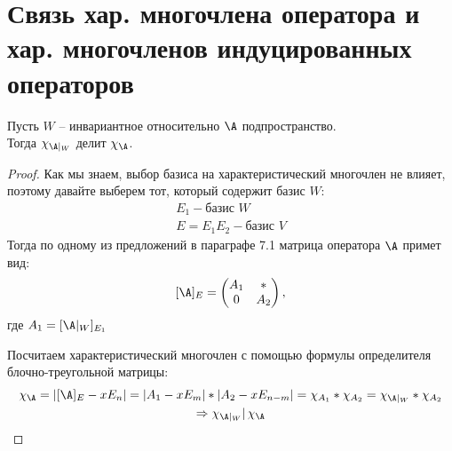\section{Связь хар. многочлена оператора и хар. многочленов индуцированных операторов}
\begin{theorem}
    Пусть $W$ -- инвариантное относительно $\A$ подпространство. \\
    Тогда $\chi_{\A|_W}$ делит $\chi_{\A}$.
\end{theorem}
\begin{proof}
    Как мы знаем, выбор базиса на характеристический многочлен не влияет, поэтому давайте выберем тот, который содержит базис $W$:
    \begin{gather*}
        E_1 - \text{базис $W$} \\
        E = E_1E_2 - \text{базис $V$}
    \end{gather*}
    \quad Тогда по одному из предложений в параграфе 7.1 матрица оператора $\A$ примет вид:
    \[ [\A]_E = \begin{pmatrix}
        A_1 & * \\
        0 & A_2
    \end{pmatrix}, \]
    \quad где $A_1 = [\A|_W]_{E_1}$
    
    \quad Посчитаем характеристический многочлен с помощью формулы определителя блочно-треугольной матрицы:
    \begin{gather*}
        \chi_{\A} = |[\A]_E - xE_n| = |A_1 - xE_m|*|A_2 - xE_{n-m}| = \chi_{A_1} * \chi_{A_2} = \chi_{\A|_W} * \chi_{A_2} \\
        \Rightarrow \chi_{\A|_W} | \, \chi_{\A}
    \end{gather*}
\end{proof}